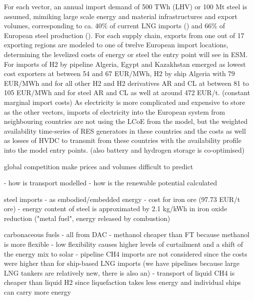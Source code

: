 For each vector, an annual import demand of 500 TWh (LHV) or 100 Mt steel is assumed, mimiking large scale energy and material infrastructures and export volumes, corresponding to ca. 40\% of current LNG imports (\cite{instituteforenergyeconomicsandfinancialanalysisEuropeanLNG2023}) and 66\% of European steel production (\cite{theeuropeansteelassociationEuropeanSteel2023}).
For each supply chain, exports from one out of 17 exporting regions are modeled to one of twelve European import locations, determining the levelized costs of energy or steel the entry point will see in ESM.
For imports of H2 by pipeline Algeria, Egypt and Kazakhstan emerged as lowest cost exporters at between 54 and 67 EUR/MWh, H2 by ship Algeria with 79 EUR/MWh and for all other H2 and H2 derivatives AR and CL at between 81 to 105 EUR/MWh and for steel AR and CL as well at around 472 EUR/t. (constant marginal import costs)
As electricity is more complicated and expensive to store as the other vectors, imports of electricity into the European system from neighbouring countries are not using the LCoE from the model,  but the weighted availability time-series of RES generators in these countries and the costs as well as losses of HVDC to transmit from these countries with the availability profile into the model entry points. (also battery and hydrogen storage is co-optimised)

global competition make prices and volumes difficult to predict

- how is transport modelled
- how is the renewable potential calculated


steel imports
- as embodied/embedded energy
- cost for iron ore (97.73 EUR/t ore)
- energy content of steel is approximated by 2.1 kg/kWh in iron oxide reduction ("metal fuel", energy released by combustion) \cite{kuhnIronRecyclable2022}

carbonaceous fuels
- all from DAC
- methanol cheaper than FT because methanol is more flexible \cite{brownUltralongdurationEnergy2023}
- low flexibility causes higher levels of curtailment and a shift of the energy mix to solar
- pipeline CH4 imports are not considered since the costs were higher than for ship-based LNG imports (we have pipelines because large LNG tankers are relatively new, there is also an)
- transport of liquid CH4 is cheaper than liquid H2 since liquefaction takes less energy and individual ships can carry more energy

